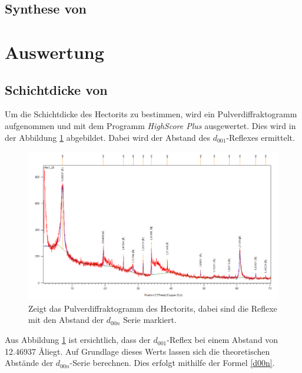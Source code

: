 \documentclass[12pt, a4paper]{article}
\begin{document}
\subsection{\texorpdfstring{Synthese von }{Synthese von Na0.5·nH2O(Zn2.5Li0.5)(Si4O10)F2}}

{
}





\newpage
\section{Auswertung}
\subsection{\texorpdfstring{Schichtdicke von }{Schichtdicke von Na0.5·nH2O(Zn2.5Li0.5)(Si4O10)F2}}
Um die Schichtdicke des Hectorits zu bestimmen, wird ein Pulverdiffraktogramm aufgenommen und mit dem Programm \textit{HighScore Plus} ausgewertet. Dies wird in der Abbildung \ref{Hec1} abgebildet. Dabei wird der Abstand des $d_{001}$-Reflexes ermittelt.

\begin{figure}[!h]
  \includegraphics[scale=0.5]{Hec1.png}
  \caption{Zeigt das Pulverdiffraktogramm des Hectorits, dabei sind die Reflexe mit den Abstand der $d_{00n}$ Serie markiert.}
  \label{Hec1}
\end{figure}
\noindent
Aus Abbildung \ref{Hec1} ist ersichtlich, dass der $d_{001}$-Reflex bei einem Abstand von 12.46937 \AA liegt. 
Auf Grundlage dieses Werts lassen sich die theoretischen Abstände der $d_{00n}$-Serie berechnen. Dies erfolgt mithilfe der Formel \ref{d00n}.
\end{document}
